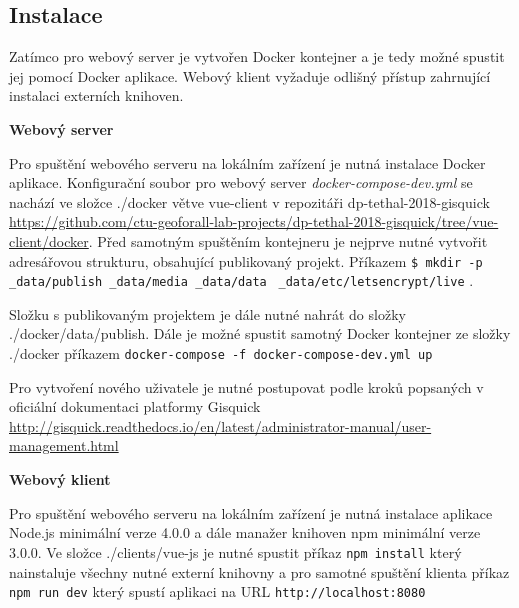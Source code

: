 \subsection{Instalace}
\label{sssec:manual-instalace}

Zatímco pro webový server je vytvořen Docker kontejner a je tedy možné spustit jej pomocí Docker aplikace. Webový klient vyžaduje odlišný přístup zahrnující instalaci externích knihoven.

\bigskip
\noindent
\textbf{Webový server}

\noindent
Pro spuštění webového serveru na lokálním zařízení je nutná instalace Docker aplikace. Konfigurační soubor pro webový server \textit{docker-compose-dev.yml} se nachází ve složce ./docker větve vue-client v repozitáři dp-tethal-2018-gisquick \newline \url{https://github.com/ctu-geoforall-lab-projects/dp-tethal-2018-gisquick/tree/vue-client/docker}.
Před samotným spuštěním kontejneru je nejprve nutné vytvořit adresářovou strukturu, obsahující publikovaný projekt.
Příkazem \newline \verb|$ mkdir -p _data/publish _data/media _data/data | \newline \verb|_data/etc/letsencrypt/live| \cite{gisquick-manual}. 

\noindent
Složku s publikovaným projektem je dále nutné nahrát do složky ./docker/\textunderscore data/publish. Dále je možné spustit samotný Docker kontejner ze složky ./docker
příkazem \newline \verb|docker-compose -f docker-compose-dev.yml up|

\noindent
Pro vytvoření nového uživatele je nutné postupovat podle kroků popsaných v oficiální dokumentaci platformy Gisquick \url{http://gisquick.readthedocs.io/en/latest/administrator-manual/user-management.html}

\bigskip
\noindent
\textbf{Webový klient}

\noindent
Pro spuštění webového serveru na lokálním zařízení je nutná instalace aplikace Node.js minimální verze 4.0.0 a dále manažer knihoven npm minimální verze 3.0.0. Ve složce ./clients/vue-js je nutné spustit příkaz \newline \verb|npm install| \newline který nainstaluje všechny nutné externí knihovny a pro samotné spuštění klienta příkaz \newline \verb|npm run dev| \newline který spustí aplikaci na URL \verb|http://localhost:8080|



